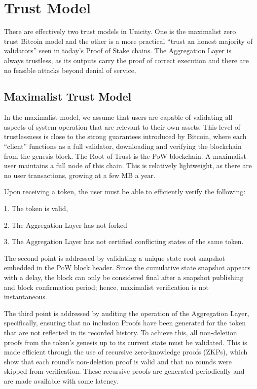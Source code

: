 \documentclass{article}
\begin{document}
\section{Trust Model}
There are effectively two trust models in Unicity. One is the maximalist zero trust Bitcoin model and the other is a more practical “trust an honest majority of validators” seen in today’s Proof of Stake chains. The Aggregation Layer is always trustless, as its outputs carry the proof of correct execution and there are no feasible attacks beyond denial of service.

\subsection{Maximalist Trust Model}

In the maximalist model, we assume that users are capable of validating all aspects of system operation that are relevant to their own assets. This level of trustlessness is close to the strong guarantees introduced by Bitcoin, where each “client” functions as a full validator, downloading and verifying the blockchain from the genesis block. The Root of Trust is the PoW blockchain. A maximalist user maintains a full node of this chain. This is relatively lightweight, as there are no user transactions, growing at a few MB a year. 



Upon receiving a token, the user must be able to efficiently verify the following:

1. The token is valid,

2. The Aggregation Layer has not forked

3. The Aggregation Layer has not certified conflicting states of the same token.

The second point is addressed by validating a unique state root snapshot embedded in the PoW block header. Since the cumulative state snapshot appears with a delay, the block can only be considered final after a snapshot publishing and block confirmation period; hence, maximalist verification is not instantaneous.

The third point is addressed by auditing the operation of the Aggregation Layer, specifically, ensuring that no inclusion Proofs have been generated for the token that are not reflected in its recorded history. To achieve this, all non-deletion proofs from the token’s genesis up to its current state must be validated. This is made efficient through the use of recursive zero-knowledge proofs (ZKPs), which show that each round’s non-deletion proof is valid and that no rounds were skipped from verification. These recursive proofs are generated periodically and are made available with some latency.
\end{document}

